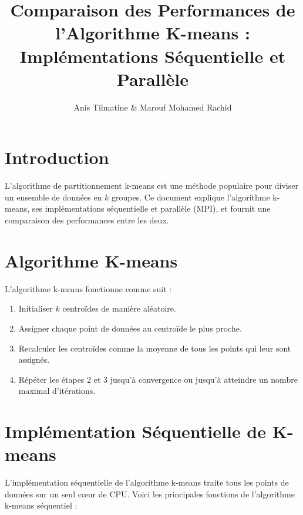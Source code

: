 \documentclass{article}
\title{Comparaison des Performances de l'Algorithme K-means : Implémentations Séquentielle et Parallèle}
\author{Anis Tilmatine \& Marouf Mohamed Rachid}
\date{}
\begin{document}
\maketitle

\section{Introduction}
L'algorithme de partitionnement k-means est une méthode populaire pour diviser un ensemble de données en $k$ groupes. Ce document explique l'algorithme k-means, ses implémentations séquentielle et parallèle (MPI), et fournit une comparaison des performances entre les deux.

\section{Algorithme K-means}
L'algorithme k-means fonctionne comme suit :
\begin{enumerate}
    \item Initialiser $k$ centroïdes de manière aléatoire.
    \item Assigner chaque point de données au centroïde le plus proche.
    \item Recalculer les centroïdes comme la moyenne de tous les points qui leur sont assignés.
    \item Répéter les étapes 2 et 3 jusqu'à convergence ou jusqu'à atteindre un nombre maximal d'itérations.
\end{enumerate}

\section{Implémentation Séquentielle de K-means}
L'implémentation séquentielle de l'algorithme k-means traite tous les points de données sur un seul cœur de CPU. Voici les principales fonctions de l'algorithme k-means séquentiel :
\end{document}
